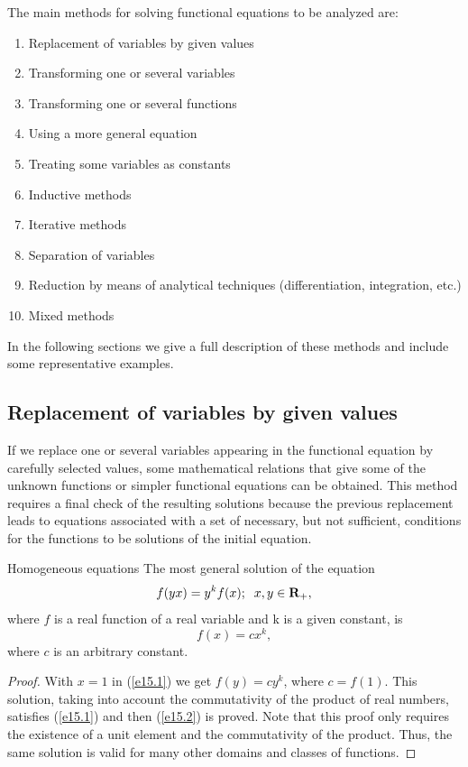 \documentclass[
	11pt, %
	fleqn, %
	a4paper, %
]{LegrandOrangeBook}
\begin{document}
The main
methods for solving functional equations to be analyzed are:
\begin{enumerate}
\item Replacement of variables by given values
\item Transforming one or several variables
\item Transforming one or several functions
\item Using a more general equation
\item Treating some variables as constants
\item Inductive methods
\item Iterative methods
\item Separation of variables
\item Reduction by means of analytical techniques (differentiation, integration, etc.)
\item Mixed methods
\end{enumerate}

In the following sections we give a full description of these methods and include
some representative examples.

\subsection{Replacement of variables by given values}
\label{s2.2}  If we replace one or several variables appearing in the functional equation by carefully
selected values, some mathematical relations that give some of the unknown functions or
simpler functional equations can be obtained. This method requires a final check of the
resulting solutions because the previous replacement leads to equations associated with a set of
necessary, but not sufficient, conditions for the functions to be solutions of the initial equation.

\begin{theorem}{Homogeneous equations}\label{th22.1} The most general
solution of the equation
\begin{equation}\label{e15.1}
f(yx)=y^kf(x);\;\;x,y\in {\bf R}_+,
\end {equation}
where $f$ is a real function of a real variable and k is a given constant, is
\begin{equation}\label{e15.2}
f(x)=cx^k,
\end {equation}
where $c$ is an arbitrary constant.
\end{theorem}
\begin{proof}
With $x=1$ in (\ref{e15.1}) we get $f(y)=cy^k$, where $c=f(1)$.
This solution, taking into account the commutativity of the
product of real numbers,  satisfies (\ref{e15.1}) and then
(\ref{e15.2}) is proved. Note that this proof only  requires the
existence of a unit element and the commutativity of the product.
Thus, the same solution is valid for many other domains and
classes of functions.
\end{proof}
\end{document}
